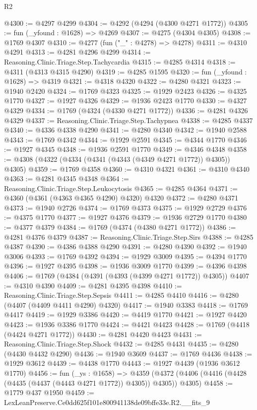 \begin{lexlean}{R2}
\begin{coremodule}
@4300 := @4297 @4299
@4304 := @4292 (@4294 (@4300 @4271 @1772))
@4305 := fun (_yfound : @1628) => @4269
@4307 := @4275 (@4304 @4305)
@4308 := @1769 @4307
@4310 := @4277 (fun ("_" : @4278) => @4278)
@4311 := @4310 @4291
@4313 := @4281 @4296 @4299
@4314 := Reasoning.Clinic.Triage.Step.Tachycardia
@4315 := @4285 @4314
@4318 := @4311 (@4313 @4315 @4290)
@4319 := @4285 @1595
@4320 := fun (_yfound : @1628) => @4319
@4321 := @4318 @4320
@4322 := @4280 @4321
@4323 := @1940 @2420
@4324 := @1769 @4323
@4325 := @1929 @2423
@4326 := @4325 @1770
@4327 := @1927 @4326
@4329 := @1936 @2423 @1770
@4330 := @4327 @4329
@4334 := @1769 (@4324 (@4330 @4271 @1772))
@4336 := @4281 @4326 @4329
@4337 := Reasoning.Clinic.Triage.Step.Tachypnea
@4338 := @4285 @4337
@4340 := @4336 @4338 @4290
@4341 := @4280 @4340
@4342 := @1940 @2588
@4343 := @1769 @4342
@4344 := @1929 @2591
@4345 := @4344 @1770
@4346 := @1927 @4345
@4348 := @1936 @2591 @1770
@4349 := @4346 @4348
@4358 := @4308 (@4322 (@4334 (@4341 (@4343 (@4349 @4271 @1772)) @4305)) @4305)
@4359 := @1769 @4358
@4360 := @4310 @4321
@4361 := @4310 @4340
@4363 := @4281 @4345 @4348
@4364 := Reasoning.Clinic.Triage.Step.Leukocytosis
@4365 := @4285 @4364
@4371 := @4360 (@4361 (@4363 @4365 @4290) @4320) @4320
@4372 := @4280 @4371
@4373 := @1940 @2726
@4374 := @1769 @4373
@4375 := @1929 @2729
@4376 := @4375 @1770
@4377 := @1927 @4376
@4379 := @1936 @2729 @1770
@4380 := @4377 @4379
@4384 := @1769 (@4374 (@4380 @4271 @1772))
@4386 := @4281 @4376 @4379
@4387 := Reasoning.Clinic.Triage.Step.Sirs
@4388 := @4285 @4387
@4390 := @4386 @4388 @4290
@4391 := @4280 @4390
@4392 := @1940 @3006
@4393 := @1769 @4392
@4394 := @1929 @3009
@4395 := @4394 @1770
@4396 := @1927 @4395
@4398 := @1936 @3009 @1770
@4399 := @4396 @4398
@4406 := @1769 (@4384 (@4391 (@4393 (@4399 @4271 @1772)) @4305))
@4407 := @4310 @4390
@4409 := @4281 @4395 @4398
@4410 := Reasoning.Clinic.Triage.Step.Sepsis
@4411 := @4285 @4410
@4416 := @4280 (@4407 (@4409 @4411 @4290) @4320)
@4417 := @1940 @3383
@4418 := @1769 @4417
@4419 := @1929 @3386
@4420 := @4419 @1770
@4421 := @1927 @4420
@4423 := @1936 @3386 @1770
@4424 := @4421 @4423
@4428 := @1769 (@4418 (@4424 @4271 @1772))
@4430 := @4281 @4420 @4423
@4431 := Reasoning.Clinic.Triage.Step.Shock
@4432 := @4285 @4431
@4435 := @4280 (@4430 @4432 @4290)
@4436 := @1940 @3609
@4437 := @1769 @4436
@4438 := @1929 @3612
@4439 := @4438 @1770
@4443 := @1927 @4439 (@1936 @3612 @1770)
@4456 := fun (_ys : @1658) =>
  @4359 (@4372 (@4406 (@4416 (@4428 (@4435 (@4437 (@4443 @4271 @1772)) @4305)) @4305)) @4305)
@4458 := @1779 @437 @1950
@4459 := LexLeanPreserve.Ce0dd625f101e800941138de09bffe33e.R2.__fits_9

\end{coremodule}
\end{lexlean}
